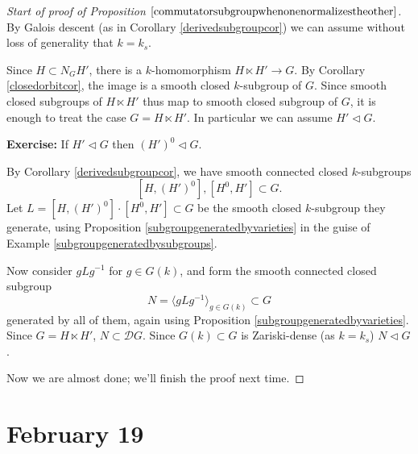 \documentclass[10pt]{article}
\newcommand{\sD}{\mathscr{D}}
\newcommand{\nsg}{\vartriangleleft}
\renewcommand{\(}{\left(}
\renewcommand{\)}{\right)}
\numberwithin{thm}{subsection}
\begin{document}
\begin{proof}[Start of proof of Proposition $\ref{commutatorsubgroupwhenonenormalizestheother}$]
By Galois descent (as in Corollary \ref{derivedsubgroupcor})
we can assume without loss of generality that $k=k_s$.

Since $H\subset N_GH'$, there is a $k$-homomorphism $H\ltimes H'\to G$.
By Corollary \ref{closedorbitcor},
the image is a smooth closed $k$-subgroup of $G$.
Since smooth closed subgroups of $H\ltimes H'$
thus map to smooth closed subgroup of $G$,
it is enough to treat the case $G= H\ltimes H'$.
In particular we can assume $H'\nsg G$.

\textbf{Exercise:} If $H'\nsg G$ then $(H')^0\nsg G$.

By Corollary \ref{derivedsubgroupcor},
we have smooth connected closed $k$-subgroups
\[[H,(H')^0],[H^0,H']\subset G.\]
Let $L=[H,(H')^0]\cdot[H^0,H']\subset G$
be the smooth closed $k$-subgroup they generate, using Proposition \ref{subgroupgeneratedbyvarieties} in the guise of Example \ref{subgroupgeneratedbysubgroups}. 

Now consider $gLg^{-1}$ for $g\in G(k)$,
and form the smooth connected closed subgroup
\[N=\langle gLg^{-1}\rangle_{g\in G(k)}\subset G\]
generated by all of them,
again using Proposition \ref{subgroupgeneratedbyvarieties}.
Since $G=H\ltimes H'$, $N\subset \sD G$.
Since $G(k)\subset G$ is Zariski-dense (as $k=k_s$)
$N\nsg G$.

Now we are almost done; we'll finish the proof next time.
\end{proof}
\section{February 19}
\end{document}
